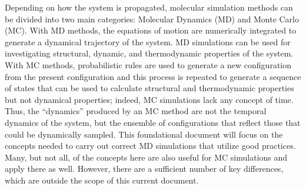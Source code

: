 \documentclass[9pt,bestpractices]{livecoms}
\begin{document}
Depending on how the system is propagated, molecular simulation methods can be divided into two main categories: Molecular Dynamics (MD) and Monte Carlo (MC).
With MD methods, the equations of motion are numerically integrated to generate a dynamical trajectory of the system.
MD simulations can be used for investigating structural, dynamic, and thermodynamic properties of the system.
With MC methods, probabilistic rules are used to generate a new configuration from the present configuration and this process is repeated to generate a sequence of states that can be used to calculate structural and thermodynamic properties but not dynamical properties; indeed, MC simulations lack any concept of time. 
Thus, the ``dynamics'' produced by an MC method are not the temporal dynamics of the system, but the ensemble of configurations that reflect those that could be dynamically sampled.
This foundational document will focus on the concepts needed to carry out correct MD simulations that utilize good practices. 
Many, but not all, of the concepts here are also useful for MC simulations and apply there as well. However, there are a sufficient number of key differences, which are outside the scope of this current document.
\end{document}

